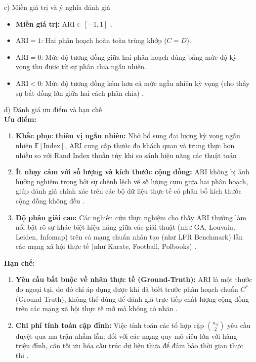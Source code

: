 \documentclass[14pt,a4paper]{extarticle}
\begin{document}
\noindent c) Miền giá trị và ý nghĩa đánh giá
\begin{itemize}
    \item \textbf{Miền giá trị:} $\text{ARI} \in [-1, 1]$ \cite{Beldi2025, Dao2020}.
    \item $\text{ARI} = 1$: Hai phân hoạch hoàn toàn trùng khớp ($C = D$).
    \item $\text{ARI} = 0$: Mức độ tương đồng giữa hai phân hoạch đúng bằng mức độ kỳ vọng thu được từ sự phân chia ngẫu nhiên.
    \item $\text{ARI} < 0$: Mức độ tương đồng kém hơn cả mức ngẫu nhiên kỳ vọng (cho thấy sự bất đồng lớn giữa hai cách phân chia) \cite{Traag2014}.
\end{itemize}

\noindent d) Đánh giá ưu điểm và hạn chế
\\ \indent
\textbf{Ưu điểm:}
\begin{enumerate}
    \item \textbf{Khắc phục thiên vị ngẫu nhiên:} Nhờ bổ sung đại lượng kỳ vọng ngẫu nhiên $\mathbb{E}[\text{Index}]$, ARI cung cấp thước đo khách quan và trung thực hơn nhiều so với Rand Index thuần túy khi so sánh hiệu năng các thuật toán \cite{Dao2020}.
    \item \textbf{Ít nhạy cảm với số lượng và kích thước cộng đồng:} ARI không bị ảnh hưởng nghiêm trọng bởi sự chênh lệch về số lượng cụm giữa hai phân hoạch, giúp đánh giá chính xác trên các bộ dữ liệu thực tế có phân bố kích thước cộng đồng không đều \cite{Dao2020}.
    \item \textbf{Độ phân giải cao:} Các nghiên cứu thực nghiệm cho thấy ARI thường làm nổi bật rõ sự khác biệt hiệu năng giữa các giải thuật (như GA, Louvain, Leiden, Infomap) trên cả mạng chuẩn nhân tạo (như LFR Benchmark) lẫn các mạng xã hội thực tế (như Karate, Football, Polbooks) \cite{Zhou2021}.
\end{enumerate}
\textbf{Hạn chế:}
\begin{enumerate}
    \item \textbf{Yêu cầu bắt buộc về nhãn thực tế (Ground-Truth):} ARI là một thước đo ngoại tại, do đó chỉ áp dụng được khi đã biết trước phân hoạch chuẩn $C^*$ (Ground-Truth), không thể dùng để đánh giá trực tiếp chất lượng cộng đồng trên các mạng xã hội thực tế mở mà không có nhãn \cite{Dao2020}.
    \item \textbf{Chi phí tính toán cặp đỉnh:} Việc tính toán các tổ hợp cặp $\binom{n_{ij}}{2}$ yêu cầu duyệt qua ma trận nhầm lẫn; đối với các mạng quy mô siêu lớn với hàng triệu đỉnh, cần tối ưu hóa cấu trúc dữ liệu thưa để đảm bảo thời gian thực thi \cite{Dao2020}.
\end{enumerate}
\end{document}
